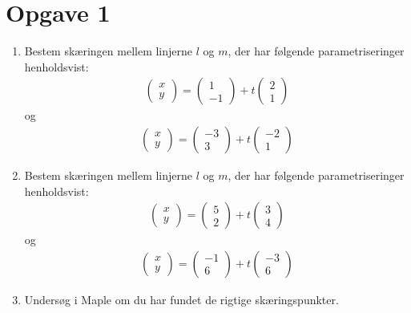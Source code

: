 \section*{Opgave 1}
\begin{enumerate}[label=\roman*)]

\item Bestem skæringen mellem linjerne $l$ og $m$, der har følgende parametriseringer henholdsvist:
\begin{align*}
\begin{pmatrix}
x \\ y
\end{pmatrix}
= 
\begin{pmatrix}
1 \\ -1
\end{pmatrix}
+
t
\begin{pmatrix}
2 \\ 1
\end{pmatrix}
\end{align*}
og 
\begin{align*}
\begin{pmatrix}
x \\ y
\end{pmatrix}
= 
\begin{pmatrix}
-3 \\ 3
\end{pmatrix}
+
t
\begin{pmatrix}
-2 \\ 1
\end{pmatrix}
\end{align*}

\item Bestem skæringen mellem linjerne $l$ og $m$, der har følgende parametriseringer henholdsvist:
\begin{align*}
\begin{pmatrix}
x \\ y
\end{pmatrix}
= 
\begin{pmatrix}
5 \\ 2
\end{pmatrix}
+
t
\begin{pmatrix}
3 \\ 4
\end{pmatrix}
\end{align*}
og 
\begin{align*}
\begin{pmatrix}
x \\ y
\end{pmatrix}
= 
\begin{pmatrix}
-1 \\ 6
\end{pmatrix}
+
t
\begin{pmatrix}
-3 \\ 6
\end{pmatrix}
\end{align*}
	\item Undersøg i Maple om du har fundet de rigtige skæringspunkter.
\end{enumerate}


